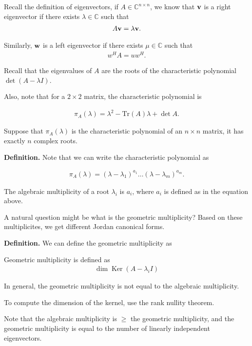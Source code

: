 \documentclass{article}
\newcommand{\CC}{\mathbb{C}}
\DeclareMathOperator{\Ker}{Ker}
\begin{document}
Recall the definition of eigenvectors, if $A \in \mathbb{C}^{n \times n}$, we know that $\mathbf{v}$ is a right eigenvector if there exists $\lambda \in \mathbb{C}$ such that
\begin{align*}
  A \mathbf{v} = \lambda \mathbf{v}.
\end{align*}

Similarly, $\mathbf{w}$ is a left eigenvector if there exists $\mu \in \CC$ such that
\begin{align*}
  w^H A = u w^H.
\end{align*}

Recall that the eigenvalues of $A$ are the roots of the characteristic polynomial $\det (A - \lambda I)$.

Also, note that for a $2 \times 2$ matrix, the characteristic polynomial is

\begin{align*}
  \pi_A(\lambda) = \lambda^2 - \text{Tr}(A) \lambda + \det A.
\end{align*}

Suppose that $\pi_A(\lambda)$ is the characteristic polynomial of an $n \times n$ matrix, it has exactly $n$ complex roots.

{\bf Definition.} Note that we can write the characteristic polynomial as 

\begin{align*}
  \pi_A(\lambda) = (\lambda - \lambda_1)^{a_1} \dots (\lambda - \lambda_m)^{a_m}.
\end{align*}

The algebraic multiplicity of a root $\lambda_i$ is $a_i$, where $a_i$ is defined as in the equation above.

A natural question might be what is the geometric multiplicity?  Based on these multiplicites, we get different Jordan canonical forms.

{\bf Definition.} We can define the geometric multiplicity as

Geometric multiplicity is defined as
\begin{align*}
  \dim \Ker (A - \lambda_i I)
\end{align*}

In general, the geometric multiplicity is not equal to the algebraic multiplicity.

To compute the dimension of the kernel, use the rank nullity theorem.

Note that the algebraic multiplicity is $\geq$ the geometric multiplicity, and the geometric multiplicity is equal to the number of linearly independent eigenvectors.
\end{document}
